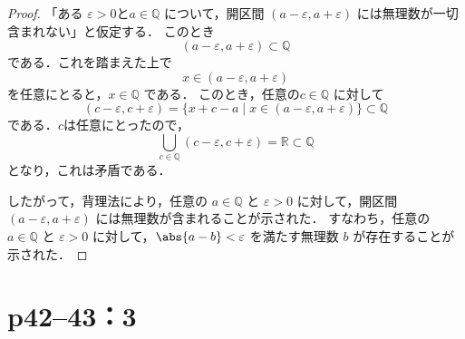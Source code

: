 \begin{leftbar}
    [別解2]
    \begin{proof}
        「ある $\varepsilon>0$と$a \in \mathbb{Q}$ について，開区間 $(a-\varepsilon,a+\varepsilon)$ には無理数が一切含まれない」と仮定する．
        このとき
        \[
            (a-\varepsilon,a+\varepsilon) \subset \mathbb{Q}
        \]
        である．これを踏まえた上で
        \[
            x \in  (a-\varepsilon,a+\varepsilon)
        \]
        を任意にとると，$ x \in \mathbb{Q} $ である．
        このとき，任意の$c \in \mathbb{Q}$ に対して
        \[
            (c-\varepsilon , c+\varepsilon) =\{ x +c -a \mid x \in (a-\varepsilon,a+\varepsilon) \} \subset \mathbb{Q}
        \]
        である．$c$は任意にとったので，
        \[
            \bigcup_{c \in \mathbb{Q}} (c-\varepsilon,c+\varepsilon) =\mathbb{R} \subset \mathbb{Q}
        \]
        となり，これは矛盾である．

        したがって，背理法により，任意の $a \in \mathbb{Q}$ と $\varepsilon > 0$ に対して，開区間 $(a-\varepsilon,a+\varepsilon)$ には無理数が含まれることが示された．
        すなわち，任意の $a \in \mathbb{Q}$ と $\varepsilon > 0$ に対して，$\abs{a-b}<\varepsilon$ を満たす無理数 $b$ が存在することが示された．
    \end{proof}
\end{leftbar}

\newpage
\section*{p42--43：3}


